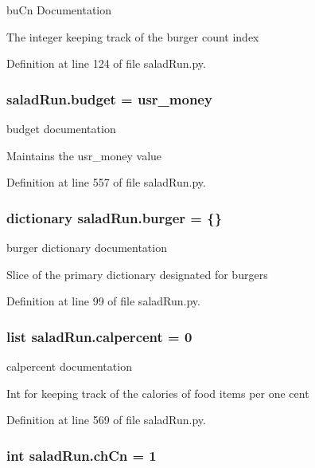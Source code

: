 bu\-Cn Documentation 

The integer keeping track of the burger count index 

Definition at line 124 of file salad\-Run.\-py.

\hypertarget{namespacesaladRun_a15478cffb6e995e57c1231ebf1ca6aa9}{
\subsubsection[{budget}]{\setlength{\rightskip}{0pt plus 5cm}salad\-Run.\-budget = {\bf usr\-\_\-money}}}\label{namespacesaladRun_a15478cffb6e995e57c1231ebf1ca6aa9}


budget documentation 

Maintains the usr\-\_\-money value 

Definition at line 557 of file salad\-Run.\-py.

\hypertarget{namespacesaladRun_a5fb2d71c63d2aa91e7bdab0a1db91666}{
\subsubsection[{burger}]{\setlength{\rightskip}{0pt plus 5cm}dictionary salad\-Run.\-burger = \{\}}}\label{namespacesaladRun_a5fb2d71c63d2aa91e7bdab0a1db91666}


burger dictionary documentation 

Slice of the primary dictionary designated for burgers 

Definition at line 99 of file salad\-Run.\-py.

\hypertarget{namespacesaladRun_a66074e916875696ee2c48e835ddceff7}{
\subsubsection[{calpercent}]{\setlength{\rightskip}{0pt plus 5cm}list salad\-Run.\-calpercent = 0}}\label{namespacesaladRun_a66074e916875696ee2c48e835ddceff7}


calpercent documentation 

Int for keeping track of the calories of food items per one cent 

Definition at line 569 of file salad\-Run.\-py.

\hypertarget{namespacesaladRun_a318d1e36ebaf120ca73a1071421a40b8}{
\subsubsection[{ch\-Cn}]{\setlength{\rightskip}{0pt plus 5cm}int salad\-Run.\-ch\-Cn = 1}}\label{namespacesaladRun_a318d1e36ebaf120ca73a1071421a40b8}


